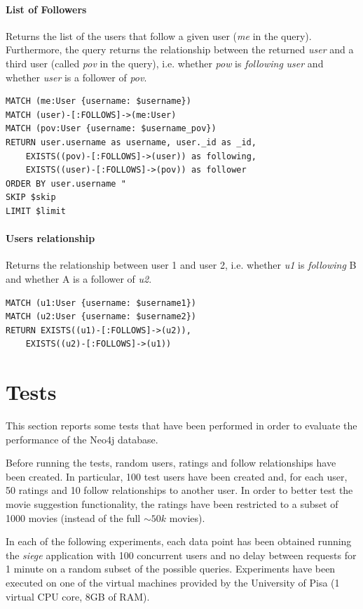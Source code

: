 \documentclass[11pt]{article}
\begin{document}
\paragraph{List of Followers} Returns the list of the users that follow a given user (\emph{me} in the query). Furthermore, the query returns the relationship between the returned \emph{user} and a third user (called \emph{pov} in the query), i.e. whether \emph{pow} is \emph{following} \emph{user} and whether \emph{user} is a follower of \emph{pov}. 

\begin{lstlisting}[language=Cypher]
MATCH (me:User {username: $username})
MATCH (user)-[:FOLLOWS]->(me:User)
MATCH (pov:User {username: $username_pov})
RETURN user.username as username, user._id as _id,
    EXISTS((pov)-[:FOLLOWS]->(user)) as following,
    EXISTS((user)-[:FOLLOWS]->(pov)) as follower
ORDER BY user.username "
SKIP $skip
LIMIT $limit
\end{lstlisting}

\paragraph{Users relationship} Returns the relationship between user 1 and user 2, i.e. whether \emph{u1} is \emph{following} B and whether A is a follower of \emph{u2}. 

\begin{lstlisting}[language=Cypher]
MATCH (u1:User {username: $username1})
MATCH (u2:User {username: $username2})
RETURN EXISTS((u1)-[:FOLLOWS]->(u2)),
    EXISTS((u2)-[:FOLLOWS]->(u1))
\end{lstlisting}

\section{Tests}
This section reports some tests that have been performed in order to evaluate 
the performance of the Neo4j database.

Before running the tests, random users, ratings and follow relationships have 
been created. In particular, 100 test users have been created and, for each 
user, 50 ratings and 10 follow relationships to another user. In order to 
better test the movie suggestion functionality, the ratings have been restricted
to a subset of 1000 movies (instead of the full $\sim50k$ movies).

In each of the following experiments, each data point has been obtained running 
the \emph{siege} application with 100 concurrent users and no delay between 
requests for 1 minute on a random subset of the possible queries. Experiments 
have been executed on one of the virtual machines provided by the University 
of Pisa (1 virtual CPU core, 8GB of RAM).
\end{document}
